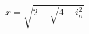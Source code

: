 \documentclass[preview]{standalone}
\begin{document}
\begin{align*}
x = \sqrt{2 - \sqrt{4 - i_n^2}}
\end{align*}
\end{document}
